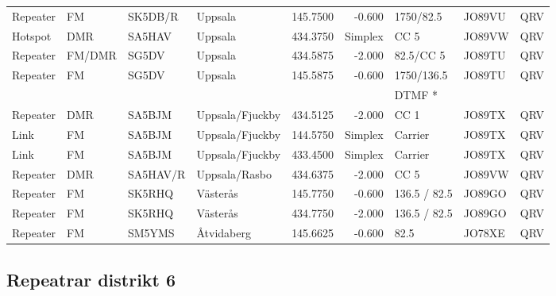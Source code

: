 \begin{longtable}{llllrrlll}
Repeater & FM         & SK5DB/R  & Uppsala           & 145.7500     & -0.600     & 1750/82.5       & JO89VU      & QRV      \\
Hotspot  & DMR        & SA5HAV   & Uppsala           & 434.3750     & Simplex    & CC 5            & JO89VW      & QRV      \\
Repeater & FM/DMR     & SG5DV    & Uppsala           & 434.5875     & -2.000     & 82.5/CC 5       & JO89TU      & QRV      \\
Repeater & FM         & SG5DV    & Uppsala           & 145.5875     & -0.600     & 1750/136.5      & JO89TU      & QRV      \\
         &            &          &                   &              &            & DTMF *          &             &          \\
Repeater & DMR        & SA5BJM   & Uppsala/Fjuckby   & 434.5125     & -2.000     & CC 1            & JO89TX      & QRV      \\
Link     & FM         & SA5BJM   & Uppsala/Fjuckby   & 144.5750     & Simplex    & Carrier         & JO89TX      & QRV      \\
Link     & FM         & SA5BJM   & Uppsala/Fjuckby   & 433.4500     & Simplex    & Carrier         & JO89TX      & QRV      \\
Repeater & DMR        & SA5HAV/R & Uppsala/Rasbo     & 434.6375     & -2.000     & CC 5            & JO89VW      & QRV      \\
Repeater & FM         & SK5RHQ   & Västerås          & 145.7750     & -0.600     & 136.5 / 82.5    & JO89GO      & QRV      \\
Repeater & FM         & SK5RHQ   & Västerås          & 434.7750     & -2.000     & 136.5 / 82.5    & JO89GO      & QRV      \\
Repeater & FM         & SM5YMS   & Åtvidaberg        & 145.6625     & -0.600     & 82.5            & JO78XE      & QRV      \\
\end{longtable}
\normalsize

\clearpage

\subsection{Repeatrar distrikt 6}

